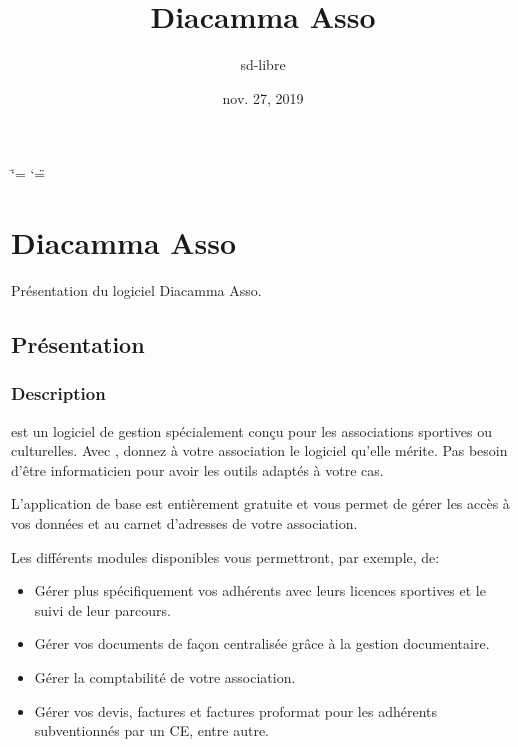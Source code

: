 \documentclass[a4paper,10pt,oneside,french]{sphinxmanual}
\title{Diacamma Asso}
\date{nov. 27, 2019}
\author{sd-libre}
\begin{document}
\ifdefined\shorthandoff
  \ifnum\catcode`\=\string=\active\shorthandoff{=}\fi
  \ifnum\catcode`\"=\active{}\fi
\fi

\pagestyle{empty}
\sphinxmaketitle
\pagestyle{plain}
\sphinxtableofcontents
\pagestyle{normal}
\label{\detokenize{index::doc}}



\chapter{Diacamma Asso}
\label{\detokenize{asso/index:diacamma-asso}}\label{\detokenize{asso/index::doc}}
Présentation du logiciel Diacamma Asso.


\section{Présentation}
\label{\detokenize{asso/presentation:presentation}}\label{\detokenize{asso/presentation::doc}}

\subsection{Description}
\label{\detokenize{asso/presentation:description}}
 est un logiciel de gestion spécialement conçu pour les associations sportives ou culturelles.
Avec , donnez à votre association le logiciel qu’elle mérite. Pas besoin d’être informaticien pour avoir les outils adaptés à votre cas.

L’application de base est entièrement gratuite et vous permet de gérer les accès à vos données et au carnet d’adresses de votre association.

Les différents modules disponibles vous permettront, par exemple, de:
\begin{itemize}
\item {} 
Gérer plus spécifiquement vos adhérents avec leurs licences sportives et le suivi de leur parcours.

\item {} 
Gérer vos documents de façon centralisée grâce à la gestion documentaire.

\item {} 
Gérer la comptabilité de votre association.

\item {} 
Gérer vos devis, factures et factures proformat pour les adhérents subventionnés par un CE, entre autre.

\end{itemize}
\end{document}
